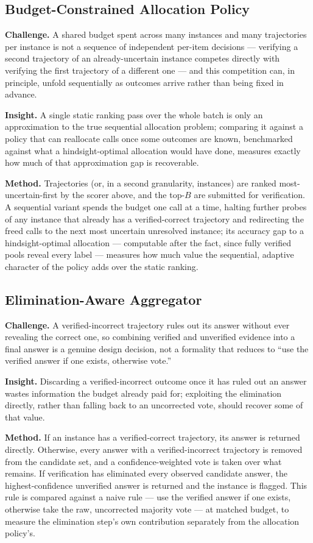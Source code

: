 \documentclass[11pt]{article}
\begin{document}
\subsection{Budget-Constrained Allocation Policy}
\textbf{Challenge.} A shared budget spent across many instances and many trajectories per instance is not a sequence of independent per-item decisions --- verifying a second trajectory of an already-uncertain instance competes directly with verifying the first trajectory of a different one --- and this competition can, in principle, unfold sequentially as outcomes arrive rather than being fixed in advance.

\textbf{Insight.} A single static ranking pass over the whole batch is only an approximation to the true sequential allocation problem; comparing it against a policy that can reallocate calls once some outcomes are known, benchmarked against what a hindsight-optimal allocation would have done, measures exactly how much of that approximation gap is recoverable.

\textbf{Method.} Trajectories (or, in a second granularity, instances) are ranked most-uncertain-first by the scorer above, and the top-$B$ are submitted for verification. A sequential variant spends the budget one call at a time, halting further probes of any instance that already has a verified-correct trajectory and redirecting the freed calls to the next most uncertain unresolved instance; its accuracy gap to a hindsight-optimal allocation --- computable after the fact, since fully verified pools reveal every label --- measures how much value the sequential, adaptive character of the policy adds over the static ranking.

\subsection{Elimination-Aware Aggregator}
\textbf{Challenge.} A verified-incorrect trajectory rules out its answer without ever revealing the correct one, so combining verified and unverified evidence into a final answer is a genuine design decision, not a formality that reduces to ``use the verified answer if one exists, otherwise vote.''

\textbf{Insight.} Discarding a verified-incorrect outcome once it has ruled out an answer wastes information the budget already paid for; exploiting the elimination directly, rather than falling back to an uncorrected vote, should recover some of that value.

\textbf{Method.} If an instance has a verified-correct trajectory, its answer is returned directly. Otherwise, every answer with a verified-incorrect trajectory is removed from the candidate set, and a confidence-weighted vote is taken over what remains. If verification has eliminated every observed candidate answer, the highest-confidence unverified answer is returned and the instance is flagged. This rule is compared against a naive rule --- use the verified answer if one exists, otherwise take the raw, uncorrected majority vote --- at matched budget, to measure the elimination step's own contribution separately from the allocation policy's.
\end{document}

